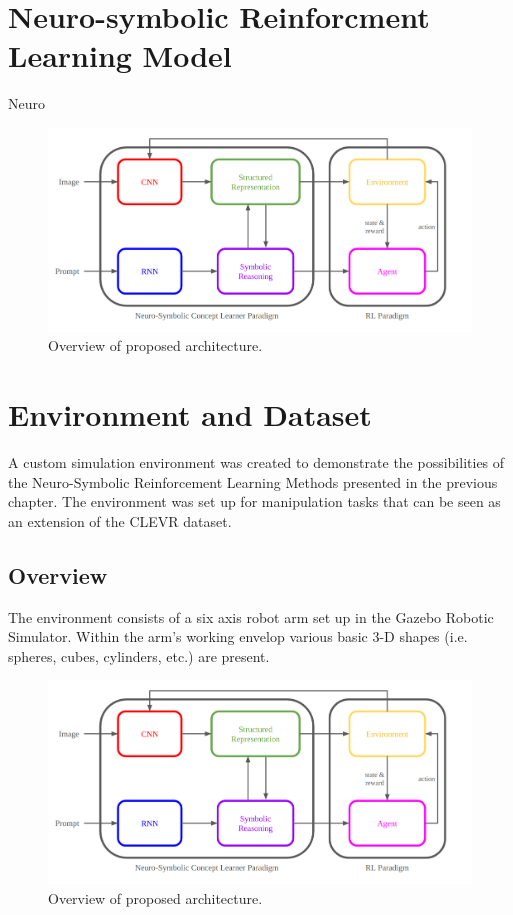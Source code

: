 \documentclass[doublespace,draft,nopageskip]{VTthesis} %
\begin{document}
    \chapter{Neuro-symbolic Reinforcment Learning Model}
    Neuro\\
    \begin{figure}[htb]
        \centering
		    \includegraphics[scale=0.25]{./images/architecture_overview}
				\caption{Overview of proposed architecture.} 
			\label{fig:architecture_overview}
	\end{figure}

    \chapter{Environment and Dataset} \label{ch:training_environment}
    A custom simulation environment was created to demonstrate the possibilities of the Neuro-Symbolic Reinforcement Learning Methods presented in the previous chapter. The environment was set up for manipulation tasks that can be seen as an extension of the CLEVR dataset.
    \section{Overview} \label{ch:environment_overview}
    The environment consists of a six axis robot arm set up in the Gazebo Robotic Simulator. Within the arm's working envelop various basic 3-D shapes (i.e. spheres, cubes, cylinders, etc.) are present.
    
    \begin{figure}[htb]
        \centering
		    \includegraphics[scale=0.25]{./images/architecture_overview}
				\caption{Overview of proposed architecture.} 
			\label{fig:architecture_overview}
	\end{figure}
\end{document}

